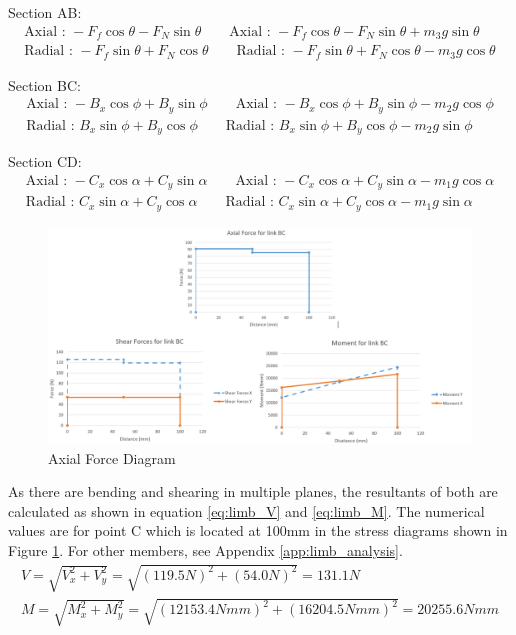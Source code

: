Section AB:
\begin{gather}
    \text{Axial : }-F_f \cos{\theta} -F_N \sin{\theta}
    \qquad\text{Axial : }-F_f \cos{\theta} -F_N \sin{\theta} + m_3 g\sin{\theta} \label{eq:limb_AB_axial}
    \\
    \text{Radial : }-F_f \sin{\theta} + F_N \cos{\theta}
    \qquad\text{Radial : }-F_f \sin{\theta} + F_N \cos{\theta}- m_3 g \cos{\theta}\label{eq:limb_AB_radial}
\end{gather}

Section BC:
\begin{gather}
    \text{Axial : } -B_x \cos{\phi} + B_y \sin{\phi}
    \qquad\text{Axial : } -B_x \cos{\phi} + B_y \sin{\phi} - m_2 g \cos{\phi} \label{eq:limb_BC_axial}
    \\
    \text{Radial : }  B_x \sin{\phi} + B_y \cos{\phi}
    \qquad\text{Radial : }  B_x \sin{\phi} + B_y \cos{\phi}- m_2 g \sin{\phi}\label{eq:limb_BC_radial}
\end{gather}

Section CD:
\begin{gather}
    \text{Axial : } -C_x \cos{\alpha} + C_y \sin{\alpha}
    \qquad\text{Axial : } -C_x \cos{\alpha} + C_y \sin{\alpha}- m_1 g \cos{\alpha}\label{eq:limb_CD_axial}
    \\
    \text{Radial : }  C_x \sin{\alpha} + C_y \cos{\alpha}
    \qquad\text{Radial : }  C_x \sin{\alpha} + C_y \cos{\alpha}- m_1 g \sin{\alpha} \label{eq:limb_CD_radial}
\end{gather}

\begin{figure}
    \centering
    \includegraphics[width=\textwidth]{4_Analysis/img/Limbs/Forces.PNG}
    \caption{Axial Force Diagram}
    \label{fig:limb_diagram}
\end{figure}

As there are bending and shearing in multiple planes, the resultants of both are calculated as shown in equation \ref{eq:limb_V} and \ref{eq:limb_M}. The numerical values are for point C which is located at 100mm in the stress diagrams shown in Figure \ref{fig:limb_diagram}. For other members, see Appendix \ref{app:limb_analysis}.
\begin{gather}
    V = \sqrt{V_x^2 + V_y^2} = \sqrt{(119.5 N)^2 + (54.0 N)^2} = 131.1 N \label{eq:limb_V}
    \\
    M = \sqrt{M_x^2 + M_y^2} = \sqrt{(12153.4 Nmm)^2 + (16204.5 Nmm)^2} = 20255.6 Nmm \label{eq:limb_M}
\end{gather}

